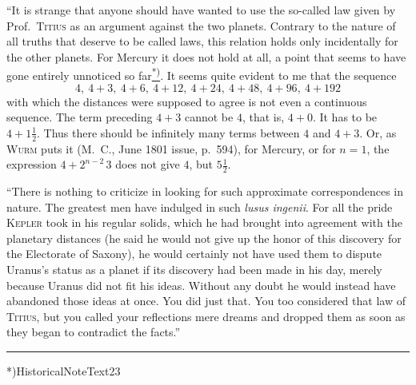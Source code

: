 “It is strange that anyone should have wanted to use the so-called law given by Prof.\ \textsc{Titius} as an argument against the two planets. Contrary to the nature of all truths that deserve to be called laws, this relation holds only incidentally for the other planets. For Mercury it does not hold at all, a point that seems to have gone entirely unnoticed so far\hyperlink{native-236-note}{\textsuperscript{*)}}. It seems quite evident to me that the sequence
\[
4,\ 4+3,\ 4+6,\ 4+12,\ 4+24,\ 4+48,\ 4+96,\ 4+192
\]
with which the distances were supposed to agree is not even a continuous sequence. The term preceding $4+3$ cannot be $4$, that is, $4+0$. It has to be $4+1\frac12$. Thus there should be infinitely many terms between $4$ and $4+3$. Or, as \textsc{Wurm} puts it (M.\ C., June 1801 issue, p.\ 594), for Mercury, or for $n=1$, the expression $4+2^{n-2}\,3$ does not give $4$, but $5\frac12$.

“There is nothing to criticize in looking for such approximate correspondences in nature. The greatest men have indulged in such \textit{lusus ingenii}. For all the pride \textsc{Kepler} took in his regular solids, which he had brought into agreement with the planetary distances (he said he would not give up the honor of this discovery for the Electorate of Saxony), he would certainly not have used them to dispute Uranus’s status as a planet if its discovery had been made in his day, merely because Uranus did not fit his ideas. Without any doubt he would instead have abandoned those ideas at once. You did just that. You too considered that law of \textsc{Titius}, but you called your reflections mere dreams and dropped them as soon as they began to contradict the facts.”
\par\nobreak\smallskip
\noindent\rule{.24\linewidth}{.3pt}\par\nobreak\smallskip
{\footnotesize\indent\hypertarget{native-236-note}{}*)\enspace\csname HistoricalNoteText23\endcsname\par}
\begin{flushright}\end{flushright}

